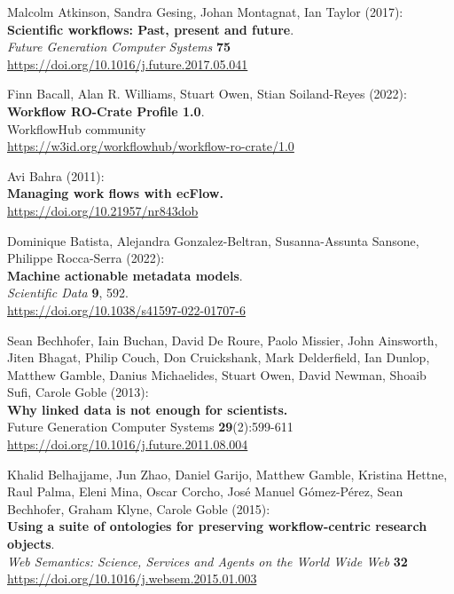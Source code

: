 \documentclass[10pt,letterpaper]{article}
\begin{document}
\begin{thebibliography}{10}
\begin{small}
 Malcolm Atkinson, Sandra Gesing, Johan Montagnat,
Ian Taylor (2017):\\
\textbf{Scientific workflows: Past, present and future}.\\
\emph{Future Generation Computer Systems} \textbf{75}\\
\url{https://doi.org/10.1016/j.future.2017.05.041}

Finn Bacall, Alan R. Williams, Stuart Owen, Stian Soiland-Reyes (2022):\\
\textbf{Workflow RO-Crate Profile 1.0}.\\
WorkflowHub community\\
\url{https://w3id.org/workflowhub/workflow-ro-crate/1.0}

Avi Bahra (2011):\\
\textbf{Managing work flows with ecFlow.}\\
\url{https://doi.org/10.21957/nr843dob}

Dominique Batista, Alejandra Gonzalez-Beltran, Susanna-Assunta Sansone, Philippe Rocca-Serra (2022):\\
\textbf{Machine actionable metadata models}.\\
\emph{Scientific Data} \textbf{9}, 592.\\
\url{https://doi.org/10.1038/s41597-022-01707-6}

Sean Bechhofer, Iain Buchan, David De Roure, Paolo
Missier, John Ainsworth, Jiten Bhagat, Philip Couch, Don Cruickshank,
Mark Delderfield, Ian Dunlop, Matthew Gamble, Danius Michaelides, Stuart
Owen, David Newman, Shoaib Sufi, Carole Goble (2013):\\
\textbf{Why linked data is not enough for scientists.}\\
Future Generation Computer Systems \textbf{29}(2):599-611\\
\url{https://doi.org/10.1016/j.future.2011.08.004}

Khalid Belhajjame, Jun Zhao, Daniel Garijo, Matthew Gamble, Kristina Hettne, Raul Palma, Eleni Mina, Oscar Corcho, José Manuel Gómez-Pérez, Sean Bechhofer, Graham Klyne, Carole Goble
(2015):\\
\textbf{Using a suite of ontologies for preserving workflow-centric research objects}.\\
\emph{Web Semantics: Science, Services and Agents on the World Wide Web} \textbf{32}\\
\url{https://doi.org/10.1016/j.websem.2015.01.003}


\end{small}
\end{thebibliography}
\end{document}
